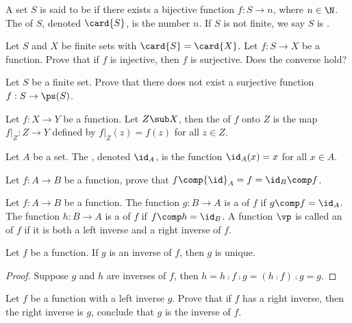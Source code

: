 \documentclass[10pt]{article}
\begin{document}
\begin{definition}
    A set $S$ is said to be  if there exists a bijective function $f:S\to n$, where $n\in\N$. The  of $S$, denoted $\card{S}$, is the number $n$. If $S$ is not finite, we say $S$ is .
\end{definition}
\begin{problem}
    Let $S$ and $X$ be finite sets with $\card{S}=\card{X}$. Let $f:S\to X$ be a function. Prove that if $f$ is injective, then $f$ is surjective. Does the converse hold?
\end{problem}
\begin{problem}
    Let $S$ be a finite set. Prove that there does not exist a surjective function $f:S\to\ps(S)$. 
\end{problem}
\begin{definition}
    Let $f:X\to Y$ be a function. Let $Z\sub X$, then the  of $f$ onto $Z$ is the map $f{\vert}_{Z}:Z\to Y$ defined by $f{\vert}_{Z}(z)=f(z)$ for all $z\in Z$.
\end{definition}
\begin{definition}
    Let $A$ be a set. The , denoted ${\id}_{A}$, is the function ${\id}_{A}(x)=x$ for all $x\in A$.
\end{definition}
\begin{problem}
    Let $f:A\to B$ be a function, prove that $f\comp{\id}_{A}=f={\id}_{B}\comp f$.
\end{problem}
\begin{definition}
    Let $f:A\to B$ be a function. The function $g:B\to A$ is a  of $f$ if $g\comp f={\id}_{A}$. The function $h:B\to A$ is a  of $f$ if $f\comp h={\id}_{B}$. A function $\vp$ is called an  of $f$ if it is both a left inverse and a right inverse of $f$.
\end{definition}
\begin{proposition}
    Let $f$ be a function. If $g$ is an inverse of $f$, then $g$ is unique.
\end{proposition}
\begin{proof}
    Suppose $g$ and $h$ are inverses of $f$, then $h=h\comp f\comp g=(h\comp f)\comp g=g$.
\end{proof}
\begin{problem}
    Let $f$ be a function with a left inverse $g$. Prove that if $f$ has a right inverse, then the right inverse is $g$, conclude that $g$ is the inverse of $f$.
\end{problem}
\end{document}
